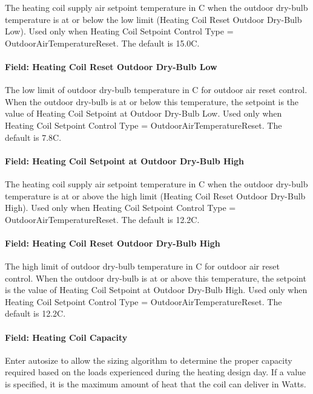 The heating coil supply air setpoint temperature in C when the outdoor dry-bulb temperature is at or below the low limit (Heating Coil Reset Outdoor Dry-Bulb Low). Used only when Heating Coil Setpoint Control Type = OutdoorAirTemperatureReset. The default is 15.0C.

\paragraph{Field: Heating Coil Reset Outdoor Dry-Bulb Low}\label{field-heating-coil-reset-outdoor-dry-bulb-low}

The low limit of outdoor dry-bulb temperature in C for outdoor air reset control. When the outdoor dry-bulb is at or below this temperature, the setpoint is the value of Heating Coil Setpoint at Outdoor Dry-Bulb Low. Used only when Heating Coil Setpoint Control Type = OutdoorAirTemperatureReset. The default is 7.8C.

\paragraph{Field: Heating Coil Setpoint at Outdoor Dry-Bulb High}\label{field-heating-coil-setpoint-at-outdoor-dry-bulb-high}

The heating coil supply air setpoint temperature in C when the outdoor dry-bulb temperature is at or above the high limit (Heating Coil Reset Outdoor Dry-Bulb High). Used only when Heating Coil Setpoint Control Type = OutdoorAirTemperatureReset. The default is 12.2C.

\paragraph{Field: Heating Coil Reset Outdoor Dry-Bulb High}\label{field-heating-coil-reset-outdoor-dry-bulb-high}

The high limit of outdoor dry-bulb temperature in C for outdoor air reset control. When the outdoor dry-bulb is at or above this temperature, the setpoint is the value of Heating Coil Setpoint at Outdoor Dry-Bulb High. Used only when Heating Coil Setpoint Control Type = OutdoorAirTemperatureReset. The default is 12.2C.

\paragraph{Field: Heating Coil Capacity}\label{field-heating-coil-capacity-3}

Enter autosize to allow the sizing algorithm to determine the proper capacity required based on the loads experienced during the heating design day. If a value is specified, it is the maximum amount of heat that the coil can deliver in Watts.

